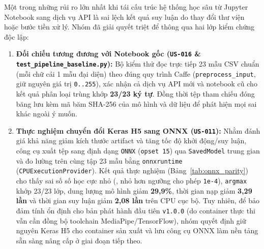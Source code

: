 Một trong những rủi ro lớn nhất khi tái cấu trúc hệ thống học sâu từ Jupyter Notebook sang dịch vụ API là sai lệch kết quả suy luận do thay đổi thư viện hoặc bước tiền xử lý. Nhóm đã giải quyết triệt để thông qua hai lớp kiểm chứng độc lập:
\begin{enumerate}
    \item \textbf{Đối chiếu tương đương với Notebook gốc (\texttt{US-016} \& \texttt{test\_pipeline\_baseline.py}):} Bộ kiểm thử đọc trực tiếp 23 mẫu CSV chuẩn (mỗi chữ cái 1 mẫu đại diện) theo đúng quy trình Caffe (\texttt{preprocess\_input}, giữ nguyên giá trị \texttt{0..255}), xác nhận cả dịch vụ API mới và notebook cũ cho kết quả phân loại trùng khớp \textbf{23/23 ký tự}. Đồng thời tệp tham chiếu đóng băng  lưu kèm mã băm SHA-256 của mô hình và dữ liệu để phát hiện mọi sai khác ngoài ý muốn.
    \item \textbf{Thực nghiệm chuyển đổi Keras H5 sang ONNX (\texttt{US-011}):} Nhằm đánh giá khả năng giảm kích thước artifact và tăng tốc độ khởi động/suy luận, công cụ  xuất tệp  sang định dạng \texttt{ONNX} (\texttt{opset 15}) qua \texttt{SavedModel} trung gian và đo lường trên cùng tập 23 mẫu bằng \texttt{onnxruntime} (\texttt{CPUExecutionProvider}). Kết quả thực nghiệm (Bảng~\ref{tab:onnx_parity}) cho thấy sai số số học cực nhỏ (, nhỏ hơn ngưỡng cho phép \texttt{1e-4}), \texttt{argmax} khớp 23/23 lớp, dung lượng mô hình giảm \textbf{29,9\%}, thời gian nạp giảm \textbf{3,29 lần} và thời gian suy luận giảm \textbf{2,08 lần} trên CPU cục bộ. Tuy nhiên, để bảo đảm tính ổn định cho bản phát hành đầu tiên \texttt{v1.0.0} (do container thực thi vẫn cần đồng bộ toolchain MediaPipe/TensorFlow), nhóm quyết định giữ nguyên Keras H5 cho container sản xuất và lưu công cụ ONNX làm nền tảng sẵn sàng nâng cấp ở giai đoạn tiếp theo.
\end{enumerate}

